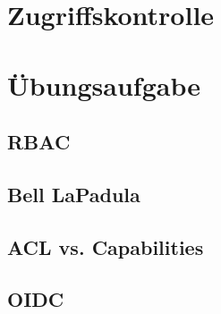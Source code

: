 \documentclass[a4paper]{article}
\title{\docTitle}
\author{Moritz}
\date{\today}
\begin{document}
\maketitle
\tableofcontents


\section{Zugriffskontrolle}




\section{Übungsaufgabe}

\subsection{RBAC}

\subsection{Bell LaPadula}

\subsection{ACL vs. Capabilities}

\subsection{OIDC}
\end{document}
